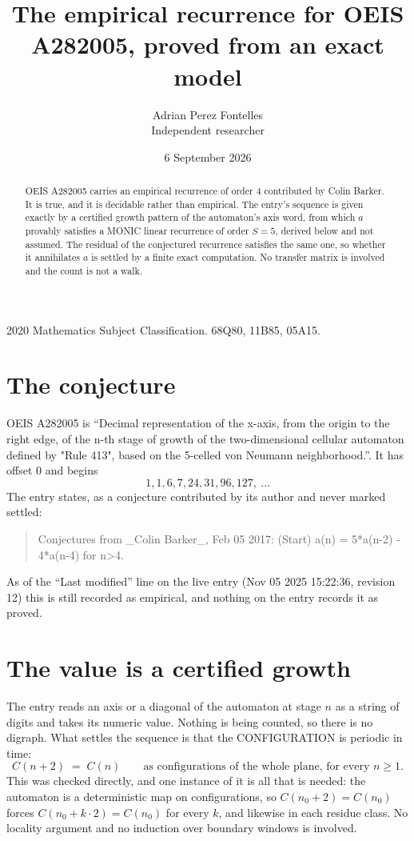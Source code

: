 \documentclass[11pt,a4paper]{article}
\title{The empirical recurrence for OEIS A282005, proved from an exact model}
\author{Adrian Perez Fontelles\\ \small Independent researcher}
\date{6 September 2026}
\theoremstyle{plain}
\theoremstyle{definition}
\begin{document}
\maketitle

\begin{abstract}
OEIS A282005 carries an empirical recurrence of order $4$ contributed by Colin Barker. It is true, and it is
decidable rather than empirical. The entry's sequence is given exactly by a certified growth pattern of the automaton's axis word, from
which $a$ provably satisfies a MONIC linear recurrence of order $S=5$, derived below and not
assumed. The residual of the conjectured recurrence satisfies the same one, so whether it
annihilates $a$ is settled by a finite exact computation. No transfer matrix is involved and
the count is not a walk.
\end{abstract}

\noindent\small 2020 Mathematics Subject Classification. 68Q80, 11B85, 05A15.\normalsize

\section{The conjecture}

OEIS A282005 is ``Decimal representation of the x-axis, from the origin to the right edge, of the n-th stage of growth of the two-dimensional cellular automaton defined by "Rule 413", based on the 5-celled von Neumann neighborhood.''. It has offset $0$ and begins
\[
1, 1, 6, 7, 24, 31, 96, 127,\ \dots
\]
The entry states, as a conjecture contributed by its author and never marked settled:
\begin{quote}
Conjectures from \_Colin Barker\_, Feb 05 2017: (Start) a(n) = 5*a(n-2) - 4*a(n-4) for n>4.
\end{quote}
As of the ``Last modified'' line on the live entry (Nov 05 2025 15:22:36, revision 12)
this is still recorded as empirical, and nothing on the entry records it as proved.

\section{The value is a certified growth}

The entry reads an axis or a diagonal of the automaton at stage $n$ as a string of digits and
takes its numeric value. Nothing is being counted, so there is no digraph. What settles the
sequence is that the CONFIGURATION is periodic in time:
\[
C(n+2)\;=\;C(n)\qquad\text{as configurations of the whole plane, for every } n\ge 1.
\]
This was checked directly, and one instance of it is all that is needed: the automaton is a
deterministic map on configurations, so $C(n_0+2)=C(n_0)$ forces $C(n_0+k\cdot2)=C(n_0)$ for
every $k$, and likewise in each residue class. No locality argument and no induction over
boundary windows is involved.
\end{document}
